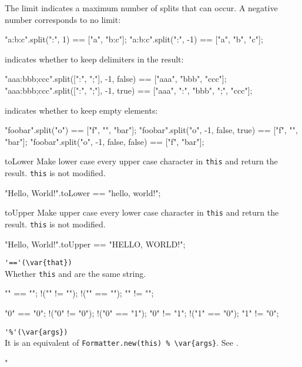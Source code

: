 \begin{urbiscriptapi}
The limit  indicates a maximum number of splits that can occur. A
negative number corresponds to no limit:

\begin{urbiassert}
"a:b:c".split(":",  1) == ["a", "b:c"];
"a:b:c".split(":", -1) == ["a", "b", "c"];
\end{urbiassert}

 indicates whether to keep delimiters in the result:

\begin{urbiassert}
"aaa:bbb;ccc".split([":", ";"], -1, false) == ["aaa",      "bbb",      "ccc"];
"aaa:bbb;ccc".split([":", ";"], -1, true)  == ["aaa", ":", "bbb", ";", "ccc"];
\end{urbiassert}

 indicates whether to keep empty elements:

\begin{urbiassert}
"foobar".split("o")                   == ["f", "", "bar"];
"foobar".split("o", -1, false, true)  == ["f", "", "bar"];
"foobar".split("o", -1, false, false) == ["f",     "bar"];
\end{urbiassert}

\item[toLower]
  Make lower case every upper case character in \lstinline|this| and
  return the result.  \lstinline|this| is not modified.
\begin{urbiassert}
"Hello, World!".toLower == "hello, world!";
\end{urbiassert}

\item[toUpper]
  Make upper case every lower case character in \lstinline|this| and
  return the result.  \lstinline|this| is not modified.
\begin{urbiassert}
"Hello, World!".toUpper == "HELLO, WORLD!";
\end{urbiassert}

\item \lstinline|'=='(\var{that})|\\
  Whether \lstinline|this| and  are the same string.
\begin{urbiassert}
  "" == "";        !("" != "");
!("" == "\0");       "" != "\0";

  "0" == "0";      !("0" != "0");
!("0" == "1");       "0" != "1";
!("1" == "0");       "1" != "0";
\end{urbiassert}

\item \lstinline|'%'(\var{args})|\\
  It is an equivalent of \lstinline|Formatter.new(this) % \var{args}|.
  See .
\begin{urbiassert}
"%
\end{urbiassert}


\end{urbiscriptapi}
